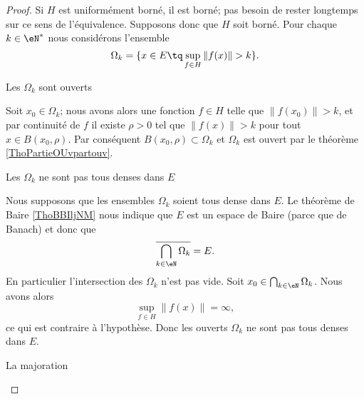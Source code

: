 \begin{proof}

    Si \( H\) est uniformément borné, il est borné; pas besoin de rester longtemps sur ce sens de l'équivalence. Supposons donc que \( H\) soit borné. Pour chaque \( k\in \eN^*\) nous considérons l'ensemble
    \begin{equation}
        \Omega_k=\{ x\in E\tq \sup_{f\in H}\| f(x) \|>k \}.
    \end{equation}

    \begin{subproof}
        \item[Les \( \Omega_k\) sont ouverts]

            Soit \( x_0\in \Omega_k\); nous avons alors une fonction \( f\in H\) telle que \(  \| f(x_0) \|>k \), et par continuité de \( f\) il existe \( \rho>0\) tel que \( \| f(x) \|>k\) pour tout \( x\in B(x_0,\rho)\). Par conséquent \( B(x_0,\rho)\subset \Omega_k\) et \( \Omega_k\) est ouvert par le théorème \ref{ThoPartieOUvpartouv}.

        \item[Les \( \Omega_k\) ne sont pas tous denses dans \( E\)]

            Nous supposons que les ensembles \( \Omega_k\) soient tous dense dans \( E\). Le théorème de Baire \ref{ThoBBIljNM} nous indique que \( E\) est un espace de Baire (parce que de Banach) et donc que
            \begin{equation}
                \overline{ \bigcap_{k\in \eN}\Omega_k }=E.
            \end{equation}
            En particulier l'intersection des \( \Omega_k\) n'est pas vide. Soit \( x_0\in \bigcap_{k\in \eN}\Omega_k\). Nous avons alors
            \begin{equation}
                \sup_{f\in H}\| f(x) \|=\infty,
            \end{equation}
            ce qui est contraire à l'hypothèse. Donc les ouverts \( \Omega_k\) ne sont pas tous denses dans \(E\).

        \item[La majoration]


\end{subproof}
\end{proof}
